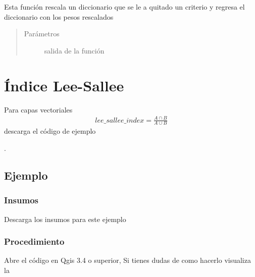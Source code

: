 \documentclass[letterpaper,10pt,spanish]{sphinxmanual}
\begin{document}

\begin{fulllineitems}
\label{\detokenize{analisis:sensibilidad_por_remocion_capas.reescala}}
Esta función rescala un diccionario que se le a quitado un criterio
y regresa el diccionario con los pesos rescalados
\begin{quote}\begin{description}
\item[{Parámetros}] \leavevmode
{} \textendash{} salida de la función 

\end{description}\end{quote}

\end{fulllineitems}



\chapter{Índice Lee-Sallee}
\label{\detokenize{leesallee:indice-lee-sallee}}\label{\detokenize{leesallee::doc}}
Para capas vectoriales
\begin{equation*}
\begin{split}lee\_sallee\_index =  \frac{A\cap B}{A\cup B}\end{split}
\end{equation*}
descarga el código de ejemplo

.


\section{Ejemplo}
\label{\detokenize{leesallee:ejemplo}}

\subsection{Insumos}
\label{\detokenize{leesallee:insumos}}
Descarga los insumos para este ejemplo 


\subsection{Procedimiento}
\label{\detokenize{leesallee:procedimiento}}
Abre el código  en Qgis 3.4 o superior,
Si tienes dudas de como hacerlo visualiza la 
\end{document}

